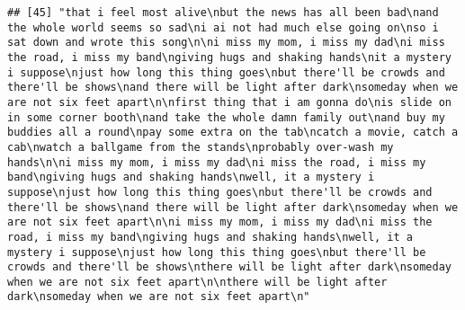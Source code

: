 \documentclass[]{article}
\begin{document}
\begin{verbatim}
## [45] "that i feel most alive\nbut the news has all been bad\nand the whole world seems so sad\ni ai not had much else going on\nso i sat down and wrote this song\n\ni miss my mom, i miss my dad\ni miss the road, i miss my band\ngiving hugs and shaking hands\nit a mystery i suppose\njust how long this thing goes\nbut there'll be crowds and there'll be shows\nand there will be light after dark\nsomeday when we are not six feet apart\n\nfirst thing that i am gonna do\nis slide on in some corner booth\nand take the whole damn family out\nand buy my buddies all a round\npay some extra on the tab\ncatch a movie, catch a cab\nwatch a ballgame from the stands\nprobably over-wash my hands\n\ni miss my mom, i miss my dad\ni miss the road, i miss my band\ngiving hugs and shaking hands\nwell, it a mystery i suppose\njust how long this thing goes\nbut there'll be crowds and there'll be shows\nand there will be light after dark\nsomeday when we are not six feet apart\n\ni miss my mom, i miss my dad\ni miss the road, i miss my band\ngiving hugs and shaking hands\nwell, it a mystery i suppose\njust how long this thing goes\nbut there'll be crowds and there'll be shows\nthere will be light after dark\nsomeday when we are not six feet apart\n\nthere will be light after dark\nsomeday when we are not six feet apart\n"                                                                                                                                                                                                                                                                                                                                                                                                                                                                                                                                                                                                                                                                                                                                                                                                                                                                                                                                                                                                                                                                                                                                                                                                                                                                                                                                                                                                                                                                                                                                                                                                                 

\end{verbatim}
\end{document}
